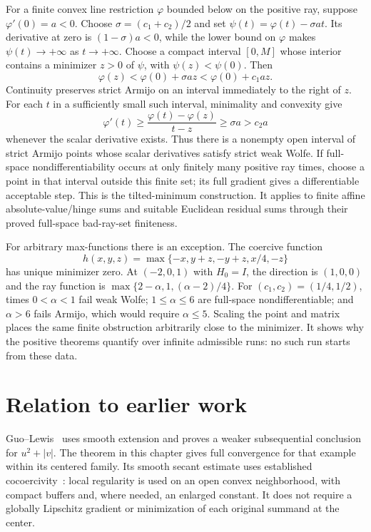 For a finite convex line restriction $\varphi$ bounded below on the positive ray, suppose $\varphi'(0)=a<0$. Choose $\sigma=(c_1+c_2)/2$ and set $\psi(t)=\varphi(t)-\sigma at$. Its derivative at zero is $(1-\sigma)a<0$, while the lower bound on $\varphi$ makes $\psi(t)\to+\infty$ as $t\to+\infty$. Choose a compact interval $[0,M]$ whose interior contains a minimizer $z>0$ of $\psi$, with $\psi(z)<\psi(0)$. Then
\[
 \varphi(z)<\varphi(0)+\sigma az<\varphi(0)+c_1az.
\]
Continuity preserves strict Armijo on an interval immediately to the right of $z$. For each $t$ in a sufficiently small such interval, minimality and convexity give
\[
 \varphi'(t)\ge\frac{\varphi(t)-\varphi(z)}{t-z}\ge\sigma a>c_2a
\]
whenever the scalar derivative exists. Thus there is a nonempty open interval of strict Armijo points whose scalar derivatives satisfy strict weak Wolfe. If full-space nondifferentiability occurs at only finitely many positive ray times, choose a point in that interval outside this finite set; its full gradient gives a differentiable acceptable step. This is the tilted-minimum construction. It applies to finite affine absolute-value/hinge sums and suitable Euclidean residual sums through their proved full-space bad-ray-set finiteness.

For arbitrary max-functions there is an exception. The coercive function
\[
 h(x,y,z)=\max\{-x,y+z,-y+z,x/4,-z\}
\]
has unique minimizer zero. At $(-2,0,1)$ with $H_0=I$, the direction is $(1,0,0)$ and the ray function is $\max\{2-\alpha,1,(\alpha-2)/4\}$. For $(c_1,c_2)=(1/4,1/2)$, times $0<\alpha<1$ fail weak Wolfe; $1\le\alpha\le6$ are full-space nondifferentiable; and $\alpha>6$ fails Armijo, which would require $\alpha\le5$. Scaling the point and matrix places the same finite obstruction arbitrarily close to the minimizer. It shows why the positive theorems quantify over infinite admissible runs: no such run starts from these data.


\section*{Relation to earlier work}
Guo--Lewis~\cite[Theorem~4.1 and Corollary~4.4]{GL18} uses smooth extension and proves a weaker subsequential conclusion for $u^2+|v|$. The theorem in this chapter gives full convergence for that example within its centered family. Its smooth secant estimate uses established cocoercivity~\cite[Theorem~2.5]{WW}: local regularity is used on an open convex neighborhood, with compact buffers and, where needed, an enlarged constant. It does not require a globally Lipschitz gradient or minimization of each original summand at the center.

